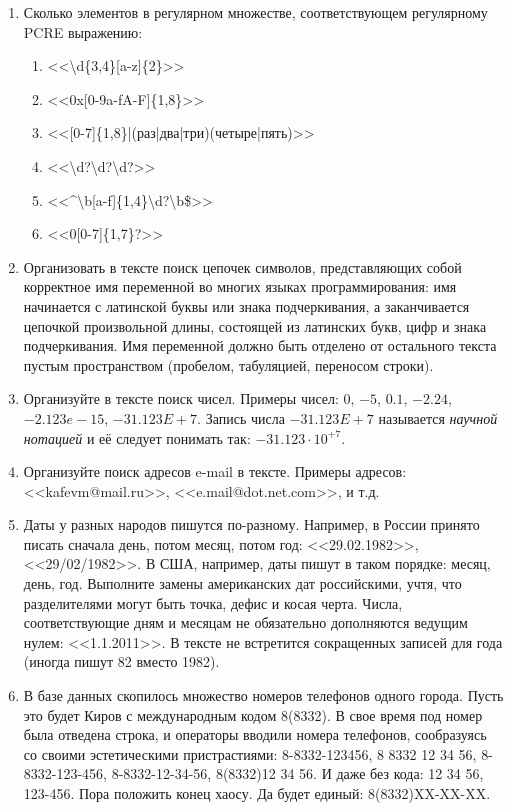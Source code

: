\begin{enumerate}
    \item Сколько элементов в регулярном множестве, соответствующем регулярному PCRE выражению:
    \begin{enumerate}
        \item <<\textbackslash d\{3,4\}[a-z]\{2\}>>
        \item <<0x[0-9a-fA-F]\{1,8\}>>
        \item <<[0-7]\{1,8\}|(раз|два|три)(четыре|пять)>>
        \item <<\textbackslash d?\textbackslash d?\textbackslash d?>>
        \item <<\^{}\textbackslash b[a-f]\{1,4\}\textbackslash d?\textbackslash b\$>>
        \item <<0[0-7]\{1,7\}?>>
    \end{enumerate}

    \item Организовать в тексте поиск цепочек символов, представляющих собой корректное имя переменной во многих языках программирования: имя начинается с латинской буквы или знака подчеркивания, а заканчивается цепочкой произвольной длины, состоящей из латинских букв, цифр и знака подчеркивания. Имя переменной должно быть отделено от остального текста пустым пространством (пробелом, табуляцией, переносом строки).
    
    \item Организуйте в тексте поиск чисел. Примеры чисел: $0$, $-5$, $0.1$, $-2.24$, $-2.123e-15$, $-31.123E+7$. Запись числа $-31.123E+7$ называется \emph{научной нотацией} и её следует понимать так: $-31.123\cdot 10^{+7}$.
    
    \item Организуйте поиск адресов e-mail в тексте. Примеры адресов: <<kafevm@mail.ru>>, <<e.mail@dot.net.com>>, и т.д.
    
    \item Даты у разных народов пишутся по-разному. Например, в России принято писать сначала день, потом месяц, потом год: <<29.02.1982>>, <<29/02/1982>>. В США, например, даты пишут в таком порядке: месяц, день, год. Выполните замены американских дат российскими, учтя, что разделителями могут быть точка, дефис и косая черта. Числа, соответствующие дням и месяцам не обязательно дополняются ведущим нулем: <<1.1.2011>>. В тексте не встретится сокращенных записей для года (иногда пишут 82 вместо 1982).
    
    \item В базе данных скопилось множество номеров телефонов одного города. Пусть это будет Киров с международным кодом 8(8332). В свое время под номер была отведена строка, и операторы вводили номера телефонов, сообразуясь со своими эстетическими пристрастиями: 8-8332-123456, 8 8332 12 34 56, 8-8332-123-456, 8-8332-12-34-56, 8(8332)12 34 56. И даже без кода: 12 34 56, 123-456. Пора положить конец хаосу. Да будет единый: 8(8332)XX-XX-XX.
    

\end{enumerate}
